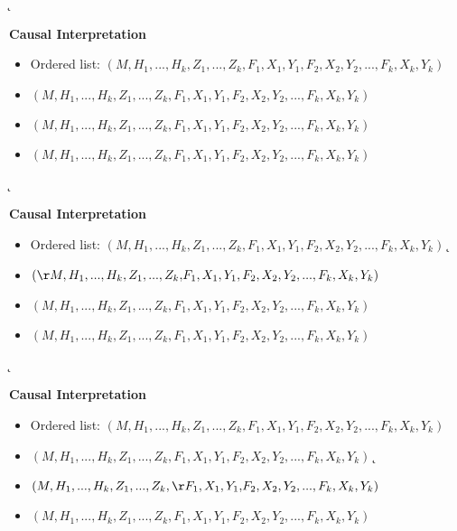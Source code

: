\documentclass[landscape,dvips,a4]{seminar}
\begin{document}
\begin{slide}\addtocounter{slide}{-1}
\k
  \begin{center}
    \textbf{\Large Causal Interpretation}
  \end{center}
 \vspace{3mm}
\begin{itemize}
\item Ordered list:  $(M,H_1,...,H_k,Z_1,...,Z_k,F_1,X_1,Y_1,F_2,X_2,Y_2,...,F_k,X_k,Y_k)$
\g
\item
  $(M,H_1,...,H_k,Z_1,...,Z_k,F_1,X_1,Y_1,F_2,X_2,Y_2,...,F_k,X_k,Y_k)$
\item
  $(M,H_1,...,H_k,Z_1,...,Z_k,F_1,X_1,Y_1,F_2,X_2,Y_2,...,F_k,X_k,Y_k)$
\item $(M,H_1,...,H_k,Z_1,...,Z_k,F_1,X_1,Y_1,F_2,X_2,Y_2,...,F_k,X_k,Y_k)$
\end{itemize}
\end{slide}

\begin{slide}\addtocounter{slide}{-1}
\k
  \begin{center}
    \textbf{\Large Causal Interpretation}
  \end{center}
 \vspace{3mm}
\begin{itemize}
\g
\item Ordered list:  $(M,H_1,...,H_k,Z_1,...,Z_k,F_1,X_1,Y_1,F_2,X_2,Y_2,...,F_k,X_k,Y_k)$
\k
\item
  $({\r M,H_1,...,H_k,Z_1,...,Z_k,}F_1,X_1,Y_1,F_2,X_2,Y_2,...,F_k,X_k,Y_k)$
\g
\item
  $(M,H_1,...,H_k,Z_1,...,Z_k,F_1,X_1,Y_1,F_2,X_2,Y_2,...,F_k,X_k,Y_k)$
\item $(M,H_1,...,H_k,Z_1,...,Z_k,F_1,X_1,Y_1,F_2,X_2,Y_2,...,F_k,X_k,Y_k)$
\end{itemize}
\end{slide}

\begin{slide}\addtocounter{slide}{-1}
\k
  \begin{center}
    \textbf{\Large Causal Interpretation}
  \end{center}
 \vspace{3mm}
\begin{itemize}
\g
\item Ordered list:  $(M,H_1,...,H_k,Z_1,...,Z_k,F_1,X_1,Y_1,F_2,X_2,Y_2,...,F_k,X_k,Y_k)$
\item
  $(M,H_1,...,H_k,Z_1,...,Z_k,F_1,X_1,Y_1,F_2,X_2,Y_2,...,F_k,X_k,Y_k)$
\k
\item
  $(M,H_1,...,H_k,Z_1,...,Z_k,{\r F_1,X_1,Y_1,}F_2,X_2,Y_2,...,F_k,X_k,Y_k)$
\g
\item $(M,H_1,...,H_k,Z_1,...,Z_k,F_1,X_1,Y_1,F_2,X_2,Y_2,...,F_k,X_k,Y_k)$
\end{itemize}
\end{slide}
\end{document}
